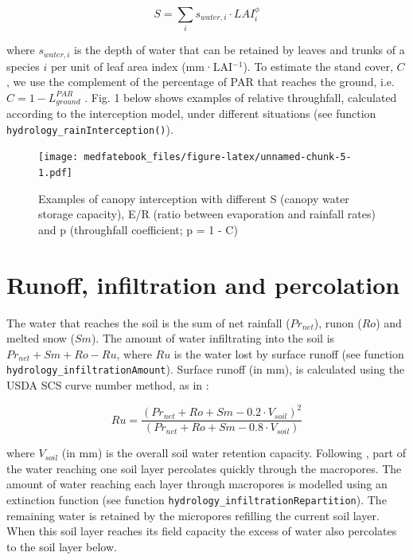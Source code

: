 \documentclass[]{book}
\begin{document}
\begin{equation}
S=\sum_{i}{s_{water,i}\cdot LAI_{i}^{\phi}}
\end{equation}

where \(s_{water,i}\) is the depth of water that can be retained by
leaves and trunks of a species \(i\) per unit of leaf area index
(mm·LAI\(^{-1}\)). To estimate the stand cover, \(C\), we use the
complement of the percentage of PAR that reaches the ground, i.e.
\(C = 1 - L^{PAR}_{ground}\) \citep{Deguchi2006}. Fig. 1 below shows
examples of relative throughfall, calculated according to the
interception model, under different situations (see function
\texttt{hydrology\_rainInterception()}).

\begin{figure}
\centering
\texttt{[image: medfatebook\_files/figure-latex/unnamed-chunk-5-1.pdf]}
\caption{\label{fig:unnamed-chunk-5}Examples of canopy interception with
different S (canopy water storage capacity), E/R (ratio between
evaporation and rainfall rates) and p (throughfall coefficient; p = 1 -
C)}
\end{figure}

\section{Runoff, infiltration and percolation}\label{runoff}

The water that reaches the soil is the sum of net rainfall
(\(Pr_{net}\)), runon (\(Ro\)) and melted snow (\(Sm\)). The amount of
water infiltrating into the soil is \(Pr_{net} + Sm + Ro - Ru\), where
\(Ru\) is the water lost by surface runoff (see function
\texttt{hydrology\_infiltrationAmount}). Surface runoff (in mm), is
calculated using the USDA SCS curve number method, as in
\citet{Boughton1989}:

\begin{equation}
Ru=\frac{(Pr_{net} + Ro + Sm - 0.2 \cdot V_{soil})^2}{(Pr_{net} + Ro + Sm - 0.8 \cdot V_{soil})}
\end{equation}

where \(V_{soil}\) (in mm) is the overall soil water retention capacity.
Following \citet{Granier1999}, part of the water reaching one soil layer
percolates quickly through the macropores. The amount of water reaching
each layer through macropores is modelled using an extinction function
(see function \texttt{hydrology\_infiltrationRepartition}). The
remaining water is retained by the micropores refilling the current soil
layer. When this soil layer reaches its field capacity the excess of
water also percolates to the soil layer below.
\end{document}
